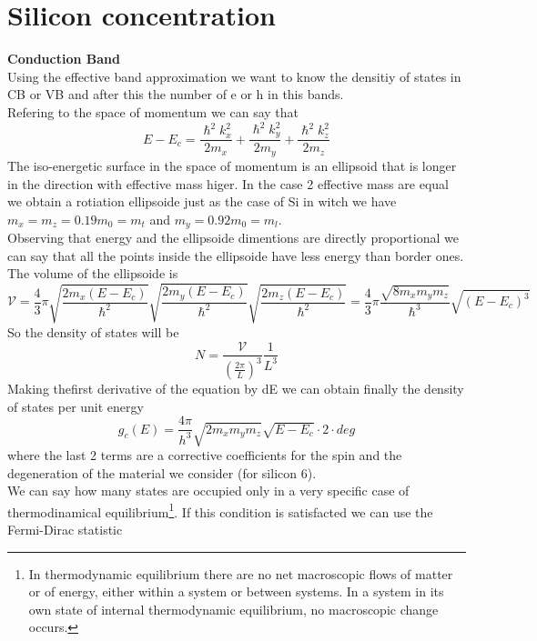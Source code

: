 \section{Silicon concentration}
{\bf Conduction Band}\\
Using the effective band approximation we want to know the densitiy of states in CB or VB and after this the number of e or h in this bands.\\
Refering to the space of momentum we can say that
\begin{equation}
E-E_c=\frac{\hslash^2 k_x^2}{2m_x}+\frac{\hslash^2 k_y^2}{2m_y}+\frac{\hslash^2 k_z^2}{2m_z}
\end{equation}
The iso-energetic surface in the space of momentum is an ellipsoid that is longer in the direction with effective mass higer. In the case 2 effective mass are equal we obtain a rotiation ellipsoide just as the case of Si in witch we have $m_x=m_z=0.19m_0=m_t$ and $m_y=0.92m_0=m_l$.\\
Observing that energy and the ellipsoide dimentions are directly proportional we can say that all the points inside the ellipsoide have less energy than border ones.\\
The volume of the ellipsoide is 
\begin{equation}
\mathcal{V}=\frac{4}{3}\pi \sqrt{\frac{2m_x(E-E_c)}{\hslash^2}}\sqrt{\frac{2m_y(E-E_c)}{\hslash^2}}\sqrt{\frac{2m_z(E-E_c)}{\hslash^2}}=\frac{4}{3}\pi\frac{\sqrt{8m_xm_ym_z}}{\hslash^3}\sqrt{(E-E_c)^3}
\end{equation}
So the density of states will be 
\begin{equation}
N=\frac{\mathcal{V}}{(\frac{2\pi}{L})^3}\frac{1}{L^3}
\end{equation}
Making thefirst derivative of the equation by dE we can obtain finally the density of states per unit energy
\begin{equation}
g_c(E)=\frac{4\pi}{h^3}\sqrt{2m_xm_ym_z}\sqrt{E-E_c}\cdot 2 \cdot deg
\end{equation}
where the last 2 terms are a corrective coefficients for the spin and the degeneration of the material we consider (for silicon 6).\\
We can say how many states are occupied only in a very specific case of thermodinamical equilibrium\footnote{In thermodynamic equilibrium there are no net macroscopic flows of matter or of energy, either within a system or between systems. In a system in its own state of internal thermodynamic equilibrium, no macroscopic change occurs.}. 
If this condition is satisfacted we can use the Fermi-Dirac statistic
